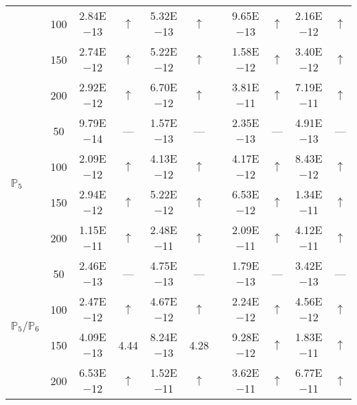 \begin{table}[H]
{\begin{tabular}{@{}l c c c c c c c c c c@{}}
 & 100 & 2.84E$-$13 & $\uparrow$  & 5.32E$-$13 & $\uparrow$ &  & 9.65E$-$13 & $\uparrow$ & 2.16E$-$12 & $\uparrow$\\
 & 150 & 2.74E$-$12 & $\uparrow$  & 5.22E$-$12 & $\uparrow$ &  & 1.58E$-$12 & $\uparrow$ & 3.40E$-$12 & $\uparrow$\\
 & 200 & 2.92E$-$12 & $\uparrow$  & 6.70E$-$12 & $\uparrow$ &  & 3.81E$-$11 & $\uparrow$ & 7.19E$-$11 & $\uparrow$\\
\midrule
\multirow{4}{*}{$\mathbb{P}_{5}$}
 & 50 & 9.79E$-$14 & ---  & 1.57E$-$13 & --- &  & 2.35E$-$13 & --- & 4.91E$-$13 & ---\\
 & 100 & 2.09E$-$12 & $\uparrow$  & 4.13E$-$12 & $\uparrow$ &  & 4.17E$-$12 & $\uparrow$ & 8.43E$-$12 & $\uparrow$\\
 & 150 & 2.94E$-$12 & $\uparrow$  & 5.22E$-$12 & $\uparrow$ &  & 6.53E$-$12 & $\uparrow$ & 1.34E$-$11 & $\uparrow$\\
 & 200 & 1.15E$-$11 & $\uparrow$  & 2.48E$-$11 & $\uparrow$ &  & 2.09E$-$11 & $\uparrow$ & 4.12E$-$11 & $\uparrow$\\
\midrule
\multirow{4}{*}{$\mathbb{P}_{5}/\mathbb{P}_{6}$}
 & 50 & 2.46E$-$13 & ---  & 4.75E$-$13 & --- &  & 1.79E$-$13 & --- & 3.42E$-$13 & ---\\
 & 100 & 2.47E$-$12 & $\uparrow$  & 4.67E$-$12 & $\uparrow$ &  & 2.24E$-$12 & $\uparrow$ & 4.56E$-$12 & $\uparrow$\\
 & 150 & 4.09E$-$13 & 4.44  & 8.24E$-$13 & 4.28 &  & 9.28E$-$12 & $\uparrow$ & 1.83E$-$11 & $\uparrow$\\
 & 200 & 6.53E$-$12 & $\uparrow$  & 1.52E$-$11 & $\uparrow$ &  & 3.62E$-$11 & $\uparrow$ & 6.77E$-$11 & $\uparrow$\\
\bottomrule
\end{tabular}}
\label{none}
\end{table}
